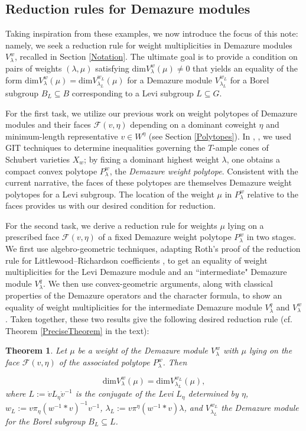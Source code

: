 \documentclass[12pt,reqno]{amsart}
\newtheorem{theorem}{Theorem}[section]
\theoremstyle{definition}
\begin{document}
\subsection{Reduction rules for Demazure modules}
Taking inspiration from these examples, we now introduce the focus of this note: namely, we seek a reduction rule for weight multiplicities in Demazure modules $V^w_\lambda$, recalled in Section \ref{Notation}. The ultimate goal is to provide a condition on pairs of weights $(\lambda, \mu)$ satisfying $\mathrm{dim} V^w_\lambda(\mu) \neq 0$ that yields an equality of the form $\mathrm{dim}V^w_\lambda(\mu) = \mathrm{dim}V^{w_L}_{\lambda_L}(\mu)$ for a Demazure module $V^{w_L}_{\lambda_L}$ for a Borel subgroup $B_L \subseteq B$ corresponding to a Levi subgroup $L \subseteq G$. 

For the first task, we utilize our previous work on weight polytopes of Demazure modules and their faces $\mathcal{F}(v, \eta)$ depending on a dominant coweight $\eta$ and minimum-length representative $v \in W^\eta$ (see Section \ref{Polytopes}). In \cite{BJK2}, \cite{BJK3}, we used GIT techniques to determine inequalities governing the $T$-ample cones of Schubert varieties $X_w$; by fixing a dominant highest weight $\lambda$, one obtains a compact convex polytope $P^w_\lambda$, the \textit{Demazure weight polytope}. Consistent with the current narrative, the faces of these polytopes are themselves Demazure weight polytopes for a Levi subgroup. The location of the weight $\mu$ in $P^w_\lambda$ relative to the faces provides us with our desired condition for reduction.


For the second task, we derive a reduction rule for weights $\mu$ lying on a prescribed face $\mathcal{F}(v,\eta)$ of a fixed Demazure weight polytope $P^w_\lambda$ in two stages. We first use algebro-geometric techniques, adapting Roth's proof of the reduction rule for Littlewood--Richardson coefficients \cite{Roth}, to get an equality of weight multiplicities for the Levi Demazure module and an ``intermediate" Demazure module $V^q_\lambda$. We then use convex-geometric arguments, along with classical properties of the Demazure operators and the character formula, to show an equality of weight multiplicities for the intermediate Demazure module $V^q_\lambda$ and $V^w_\lambda$. Taken together, these two results give the following desired reduction rule (cf. Theorem \ref{PreciseTheorem} in the text): 


\begin{theorem} \label{MainTheoremIntro}
Let $\mu$ be a weight of the Demazure module $V^w_\lambda$ with $\mu$ lying on the face $\mathcal{F}(v,\eta)$ of the associated polytope $P^w_\lambda$. Then 

$$\mathrm{dim} V^w_\lambda(\mu) = \mathrm{dim} V^{w_L}_{\lambda_L}(\mu),$$
where $L:= \dot{v}L_\eta \dot{v}^{-1}$ is the conjugate of the Levi $L_\eta$ determined by $\eta$, $w_L:= v \pi_\eta(w^{-1} \ast v)^{-1} v^{-1}$, $\lambda_L:=v \pi^{\eta}(w^{-1} \ast v) \lambda$, and $V^{w_L}_{\lambda_L}$ the Demazure module for the Borel subgroup $B_L \subseteq L$. 
\end{theorem}
\end{document}
